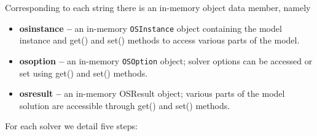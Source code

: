 \documentclass[11pt]{article}
\renewcommand{\_}{{\char"5F}}
\renewcommand{\{}{{\char"7B}}
\renewcommand{\}}{{\char"7D}}
\renewcommand{\^}{{\char"0D}}
\renewcommand{\'}{{\char"0D}}
\begin{document}
Corresponding to each string there is an in-memory object data member, namely

\begin{itemize}
\item {\bf osinstance --}  an in-memory {\tt OSInstance} object containing the model instance
and get() and set() methods to access various parts of the model.


\item {\bf osoption --} an in-memory {\tt OSOption} object; solver options can be accessed or 
set using get() and set() methods.


\item {\bf osresult --}  an in-memory OSResult object; various parts of the model solution  
are accessible through get() and set() methods.
\end{itemize}


For each solver we detail five steps:
\end{document}

